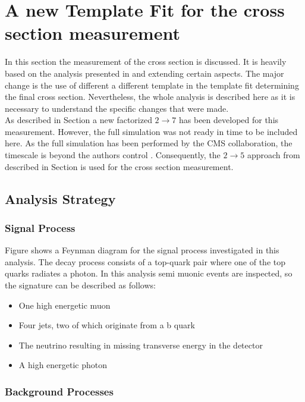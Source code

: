\chapter{A new Template Fit for the \ttgamma cross section measurement}

In this section the measurement of the \ttgamma cross section is discussed. It is heavily based on the analysis presented in \cite{CMS-PAS-TOP-13-011} and \cite{tholen:ma} extending certain aspects. The major change is the use of different a different template in the template fit determining the final cross section. Nevertheless, the whole analysis is described here as it is necessary to understand the specific changes that were made.\\
As described in Section  a new factorized $2 \to 7$ has been developed for this measurement. However, the full simulation was not ready in time to be included here. As the full simulation has been performed by the CMS collaboration, the timescale is beyond the authors control . Consequently, the $2 \to 5$ approach from \cite{CMS-PAS-TOP-13-011} described in Section  is used for the \ttgamma cross section measurement. 

\section{Analysis Strategy}
\subsection{Signal Process}
\label{sec_ttg_strat_sig}

Figure  shows a Feynman diagram for the signal process investigated in this analysis. The \ttgamma decay process consists of a top-quark pair where one of the top quarks radiates a photon. In this analysis semi muonic events are inspected, so the signature can be described as follows:
\begin{itemize}
\item One high energetic muon
\item Four jets, two of which originate from a b quark
\item The neutrino resulting in missing transverse energy in the detector
\item A high energetic photon
\end{itemize}

\subsection{Background Processes}

